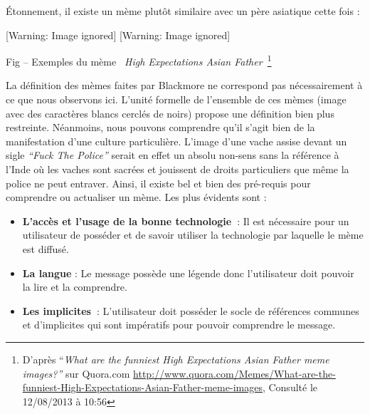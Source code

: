 \'Etonnement, il existe un m\`eme plut\^ot similaire avec un p\`ere
asiatique cette fois : 

{%
   [Warning: Image ignored] %
   [Warning: Image ignored] %
 \par}

{\centering{}\color{black}
Fig -- Exemples du m\`eme \textit{{\guillemotleft}~High Expectations
Asian Father~{\guillemotright}}\footnote{ D{\textquoteright}apr\`es
{\textquotedblleft}\textit{What are the funniest High Expectations
Asian Father meme images?{\textquotedblright}} sur Quora.com
\url{http://www.quora.com/Memes/What-are-the-funniest-High-Expectations-Asian-Father-meme-images},
Consult\'e le 12/08/2013 \`a 10:56}
\par}


La d\'efinition des m\`emes faites par Blackmore ne correspond pas
n\'ecessairement \`a ce que nous observons ici.
L{\textquoteright}unit\'e formelle de l{\textquoteright}ensemble de ces
m\`emes (image avec des caract\`eres blancs cercl\'es de noirs) propose
une d\'efinition bien plus restreinte. N\'eanmoins, nous pouvons
comprendre qu{\textquoteright}il s{\textquoteright}agit bien de la
manifestation d{\textquoteright}une culture particuli\`ere.
L{\textquoteright}image d{\textquoteright}une vache assise devant un
sigle \textit{{\textquotedblleft}Fuck The Police{\textquotedblright}
}serait en effet un absolu non-sens sans la r\'ef\'erence \`a
l{\textquoteright}Inde o\`u les vaches sont sacr\'ees et jouissent de
droits particuliers que m\^eme la police ne peut entraver. Ainsi, il
existe bel et bien des pr\'e-requis pour comprendre ou actualiser un
m\`eme. Les plus \'evidents sont :

\begin{itemize}
\item
{\color[rgb]{0.12156863,0.28627452,0.49019608}
\textbf{L{\textquoteright}acc\`es et l{\textquoteright}usage de la bonne
technologie~}: Il est n\'ecessaire pour un utilisateur de poss\'eder et
de savoir utiliser la technologie par laquelle le m\`eme est
diffus\'e.}
\item
{\color[rgb]{0.12156863,0.28627452,0.49019608}
\textbf{La langue} : Le message poss\`ede une l\'egende donc
l{\textquoteright}utilisateur doit pouvoir la lire et la comprendre.}
\item
{\color[rgb]{0.12156863,0.28627452,0.49019608}
\textbf{Les implicites~}:\textbf{ }L{\textquoteright}utilisateur doit
poss\'eder le socle de r\'ef\'erences communes et
d{\textquoteright}implicites qui sont imp\'eratifs pour pouvoir
comprendre le message. }
\end{itemize}

